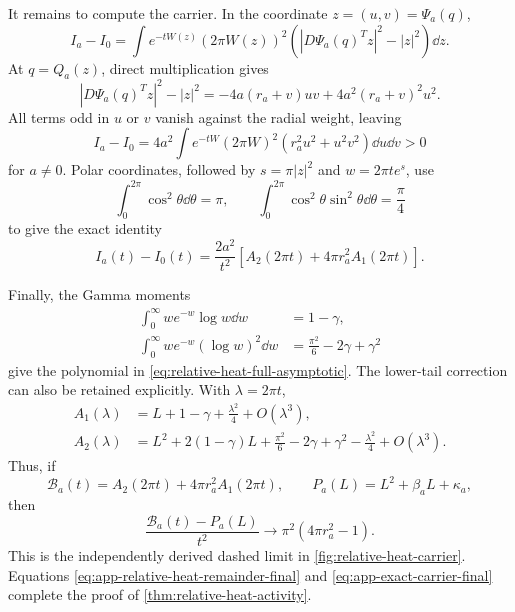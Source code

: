 It remains to compute the carrier.  In the coordinate
\(z=(u,v)=\Psi_a(q)\),
\begin{equation}
 I_a-I_0
 =\int e^{-tW(z)}(2\pi W(z))^2
 \left(|D\Psi_a(q)^Tz|^2-|z|^2\right)\dd z.
\end{equation}
At \(q=Q_a(z)\), direct multiplication gives
\begin{equation}
 |D\Psi_a(q)^Tz|^2-|z|^2
 =-4a(r_a+v)uv+4a^2(r_a+v)^2u^2.
\end{equation}
All terms odd in \(u\) or \(v\) vanish against the radial weight, leaving
\begin{equation}
 I_a-I_0=4a^2\int e^{-tW}(2\pi W)^2
 (r_a^2u^2+u^2v^2)\dd u\dd v>0
 \label{eq:app-positive-carrier-integral}
\end{equation}
for \(a\ne0\).  Polar coordinates, followed by
\(s=\pi|z|^2\) and \(w=2\pi te^s\), use
\begin{equation}
 \int_0^{2\pi}\cos^2\theta\dd\theta=\pi,
 \qquad
 \int_0^{2\pi}\cos^2\theta\sin^2\theta\dd\theta=\frac\pi4
\end{equation}
to give the exact identity
\begin{equation}
 I_a(t)-I_0(t)
 =\frac{2a^2}{t^2}
 \left[A_2(2\pi t)+4\pi r_a^2A_1(2\pi t)\right].
 \label{eq:app-exact-carrier-final}
\end{equation}

Finally, the Gamma moments
\begin{align}
 \int_0^\infty we^{-w}\log w\dd w&=1-\gamma,\\
 \int_0^\infty we^{-w}(\log w)^2\dd w
 &=\frac{\pi^2}{6}-2\gamma+\gamma^2
\end{align}
give the polynomial in \cref{eq:relative-heat-full-asymptotic}.  The
lower-tail correction can also be retained explicitly.  With
\(\lambda=2\pi t\),
\begin{align}
 A_1(\lambda)&=L+1-\gamma+\frac{\lambda^2}{4}+O(\lambda^3),\\
 A_2(\lambda)&=L^2+2(1-\gamma)L
 +\frac{\pi^2}{6}-2\gamma+\gamma^2
 -\frac{\lambda^2}{4}+O(\lambda^3).
\end{align}
Thus, if
\begin{equation}
 \mathcal B_a(t)=A_2(2\pi t)+4\pi r_a^2A_1(2\pi t),
 \qquad
 P_a(L)=L^2+\beta_aL+\kappa_a,
\end{equation}
then
\begin{equation}
 \frac{\mathcal B_a(t)-P_a(L)}{t^2}
 \longrightarrow\pi^2(4\pi r_a^2-1).
 \label{eq:app-carrier-scaled-limit}
\end{equation}
This is the independently derived dashed limit in
\cref{fig:relative-heat-carrier}.  Equations
\eqref{eq:app-relative-heat-remainder-final} and
\eqref{eq:app-exact-carrier-final} complete the proof of
\cref{thm:relative-heat-activity}.
